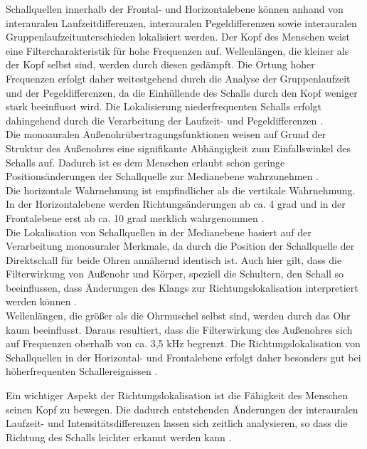 Schallquellen innerhalb der Frontal- und Horizontalebene können anhand von interauralen Laufzeitdifferenzen, interauralen Pegeldifferenzen sowie interauralen Gruppenlaufzeitunterschieden lokalisiert werden. Der Kopf des Menschen weist eine Filtercharakteristik für hohe Frequenzen auf. Wellenlängen, die kleiner als der Kopf selbst sind, werden durch diesen gedämpft. Die Ortung hoher Frequenzen erfolgt daher weitestgehend durch die Analyse der Gruppenlaufzeit und der Pegeldifferenzen, da die Einhüllende des Schalls durch den Kopf weniger stark beeinflusst wird. Die Lokalisierung niederfrequenten Schalls erfolgt dahingehend durch die Verarbeitung der Laufzeit- und Pegeldifferenzen \cite[S.45]{Genuit10}. \\ 

Die monoauralen Außenohrübertragungsfunktionen weisen auf Grund der Struktur des Außenohres eine signifikante Abhängigkeit zum Einfallswinkel des Schalls auf. Dadurch ist es dem Menschen erlaubt schon geringe Positionsänderungen der Schallquelle zur Medianebene  wahrzunehmen \cite[S.46]{Genuit10}. \\ 

Die horizontale Wahrnehmung ist empfindlicher als die vertikale Wahrnehmung. In der Horizontalebene werden Richtungsänderungen ab ca. 4 grad und in der Frontalebene erst ab ca. 10 grad merklich wahrgenommen \cite[S.95]{HdA08}.  \\

Die Lokalisation von Schallquellen in der Medianebene  basiert auf der Verarbeitung monoauraler Merkmale, da durch die Position der Schallquelle der Direktschall für beide Ohren annähernd identisch ist. Auch hier gilt, dass die Filterwirkung von Außenohr und Körper, speziell die Schultern, den Schall so beeinflussen, dass Änderungen des Klangs zur Richtungslokalisation interpretiert werden können \cite[S.46]{Genuit10}. \\

Wellenlängen, die größer als die Ohrmuschel selbst sind, werden durch das Ohr kaum beeinflusst. Daraus resultiert, dass die Filterwirkung des Außenohres sich auf Frequenzen oberhalb von ca. 3,5 kHz begrenzt. Die Richtungslokalisation von Schallquellen in der Horizontal- und Frontalebene erfolgt daher besonders gut bei höherfrequenten Schallereignissen \cite[S.47]{Genuit10}.

Ein wichtiger Aspekt der Richtungslokalisation ist die Fähigkeit des Menschen seinen Kopf zu bewegen. Die dadurch entstehenden Änderungen der interauralen Laufzeit- und Intensitätsdifferenzen lassen sich zeitlich analysieren, so dass die Richtung des Schalls leichter erkannt werden kann \cite[S.88]{HdA08}.


